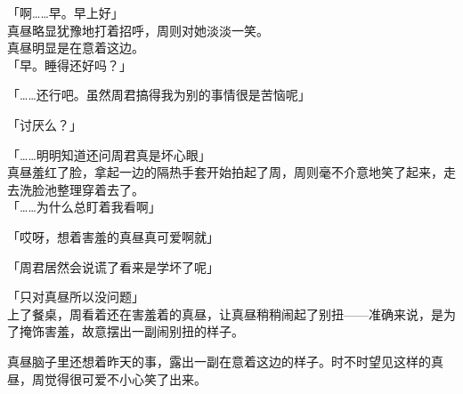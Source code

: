 「啊……早。早上好」\\

真昼略显犹豫地打着招呼，周则对她淡淡一笑。\\

真昼明显是在意着这边。\\

「早。睡得还好吗？」

「……还行吧。虽然周君搞得我为别的事情很是苦恼呢」

「讨厌么？」

「……明明知道还问周君真是坏心眼」\\

真昼羞红了脸，拿起一边的隔热手套开始拍起了周，周则毫不介意地笑了起来，走去洗脸池整理穿着去了。\\



「……为什么总盯着我看啊」

「哎呀，想着害羞的真昼真可爱啊就」

「周君居然会说谎了看来是学坏了呢」

「只对真昼所以没问题」\\

上了餐桌，周看着还在害羞着的真昼，让真昼稍稍闹起了别扭——准确来说，是为了掩饰害羞，故意摆出一副闹别扭的样子。

真昼脑子里还想着昨天的事，露出一副在意着这边的样子。时不时望见这样的真昼，周觉得很可爱不小心笑了出来。\\

